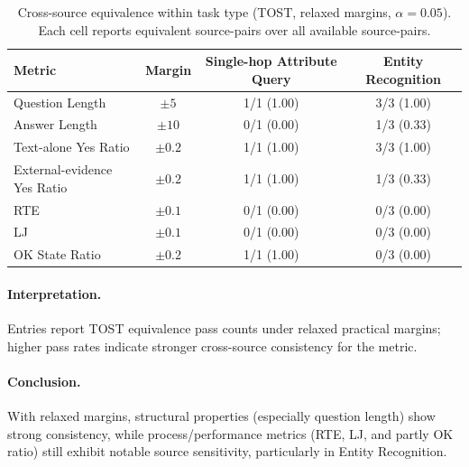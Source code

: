 \begin{table}[htbp]
    \centering
    \caption{Cross-source equivalence within task type (TOST, relaxed margins, $\alpha=0.05$). Each cell reports equivalent source-pairs over all available source-pairs.}
    \setlength{\tabcolsep}{4pt}
    \begin{tabular}{lccc}
    \hline
    Metric & Margin & Single-hop Attribute Query & Entity Recognition \\
    \hline
    Question Length & $\pm5$ & 1/1 (1.00) & 3/3 (1.00) \\
    Answer Length & $\pm10$ & 0/1 (0.00) & 1/3 (0.33) \\
    Text-alone Yes Ratio & $\pm0.2$ & 1/1 (1.00) & 3/3 (1.00) \\
    External-evidence Yes Ratio & $\pm0.2$ & 1/1 (1.00) & 1/3 (0.33) \\
    RTE & $\pm0.1$ & 0/1 (0.00) & 0/3 (0.00) \\
    LJ & $\pm0.1$ & 0/1 (0.00) & 0/3 (0.00) \\
    OK State Ratio & $\pm0.2$ & 1/1 (1.00) & 0/3 (0.00) \\
    \hline
    \end{tabular}
    \label{tab:cross_source_consistency_one_table_relaxed}
\end{table}

\paragraph{Interpretation.}
Entries report TOST equivalence pass counts under relaxed practical margins; higher pass rates indicate stronger cross-source consistency for the metric.

\paragraph{Conclusion.}
With relaxed margins, structural properties (especially question length) show strong consistency, while process/performance metrics (RTE, LJ, and partly OK ratio) still exhibit notable source sensitivity, particularly in Entity Recognition.
